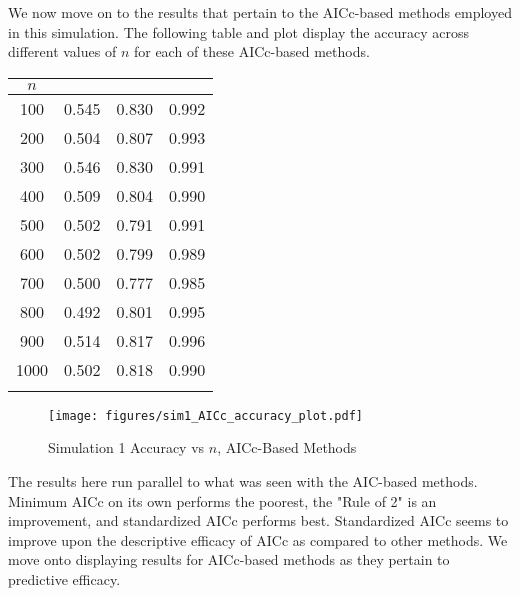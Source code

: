 		We now move on to the results that pertain to the AICc-based methods employed in this simulation. The following table and plot display the accuracy across different values
		of $n$ for each of these AICc-based methods. 

		\begin{table}[H]
			\centering
			\small\addtolength{\tabcolsep}{-3pt}
			\setlength\extrarowheight{-3pt}
			{
			\begin{tabular}{ c|c|c|c}
			$n$ & \vtop{\hbox{\strut Minimum AICc}\hbox{\strut Accuracy}} & \vtop{\hbox{\strut AICc Rule of 2}\hbox{\strut Accuracy}} & \vtop{\hbox{\strut Standardized AICc}\hbox{\strut Accuracy}} \\
			 \hline
			 100 & 0.545  &  0.830 &  0.992 \\
			 200 & 0.504  &  0.807 &  0.993 \\
			 300 & 0.546  &  0.830 &  0.991 \\
			 400 & 0.509  &  0.804 &  0.990 \\
			 500 & 0.502  &  0.791 &  0.991 \\
			 600 & 0.502  &  0.799 &  0.989 \\
			 700 & 0.500  &  0.777 &  0.985 \\
			 800 & 0.492  &  0.801 &  0.995 \\
			 900 & 0.514  &  0.817 &  0.996 \\
			 1000 &  0.502  &  0.818 &  0.990 \\
			 \Xhline{3\arrayrulewidth}
			\end{tabular}
			}
		\end{table}

		\begin{figure}[H]
			\centering
			\captionsetup{justification=centering}
			\texttt{[image: figures/sim1\_AICc\_accuracy\_plot.pdf]}
			\caption{\label{fig:sim1_aicc_accuracy_plot} Simulation 1 Accuracy vs $n$, AICc-Based Methods}
		\end{figure}

		The results here run parallel to what was seen with the AIC-based methods. Minimum AICc on its own performs the poorest, the "Rule of 2" is an improvement, and standardized
		AICc performs best. Standardized AICc seems to improve upon the descriptive efficacy of AICc as compared to other methods. We move onto displaying results for AICc-based
		methods as they pertain to predictive efficacy. 

